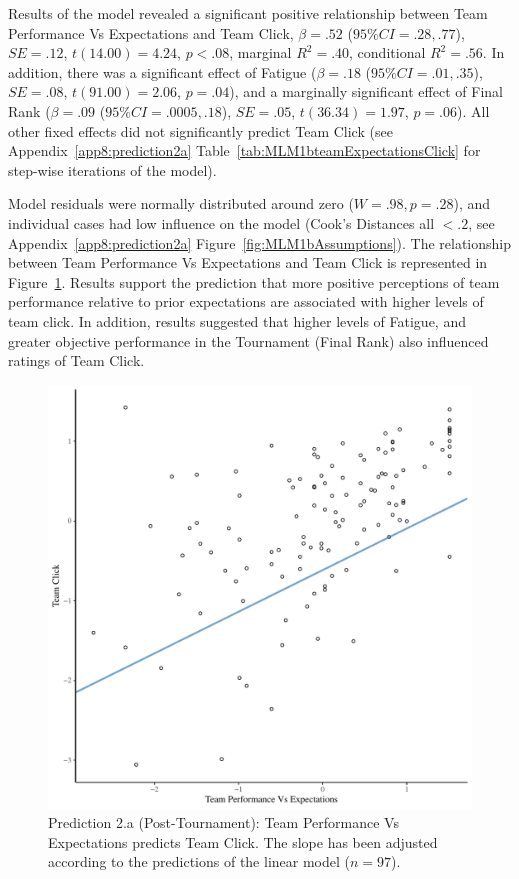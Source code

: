\begin{CJK}{UTF8}{gbsn}
Results of the model revealed a significant positive relationship between Team Performance Vs Expectations and Team Click, $\beta = .52$ ($95\% CI =  .28, .77$), $SE = .12$, $t(14.00) = 4.24$, $p < .08$, marginal $R^2 = .40$, conditional $R^2 = .56$.  In addition, there was a significant effect of Fatigue ($\beta = .18$ ($95\% CI =  .01, .35$), $SE = .08$, $t(91.00) = 2.06$, $p = .04$), and a marginally significant effect of Final Rank ($\beta = .09$ ($95\% CI =  .0005, .18$), $SE = .05$, $t(36.34) = 1.97$, $p = .06$).  All other fixed effects did not significantly predict Team Click (see Appendix~\ref{app8:prediction2a} Table~\ref{tab:MLM1bteamExpectationsClick} for step-wise iterations of the model).

Model residuals were normally distributed around zero ($W = .98, p = .28$), and individual cases had low influence on the model (Cook's Distances all $< .2$, see Appendix~\ref{app8:prediction2a} Figure~\ref{fig:MLM1bAssumptions}).  The relationship between Team Performance Vs Expectations and Team Click is represented in Figure~\ref{fig:teamPerfClickModelSlope}.  Results support the prediction that more positive perceptions of team performance relative to prior expectations are associated with higher levels of team click.   In addition, results suggested that higher levels of Fatigue, and greater objective performance in the Tournament (Final Rank) also influenced ratings of Team Click.


  \begin{figure}[htbp]
    \centering
  \includegraphics[scale=.5]{images/teamPerfClickModelSlope.pdf}
    \caption{Prediction 2.a (Post-Tournament): Team Performance Vs Expectations predicts Team Click. The slope has been adjusted according to the predictions of the linear model ($n = 97$).}
    \label{fig:teamPerfClickModelSlope}
  \end{figure}



\end{CJK}
